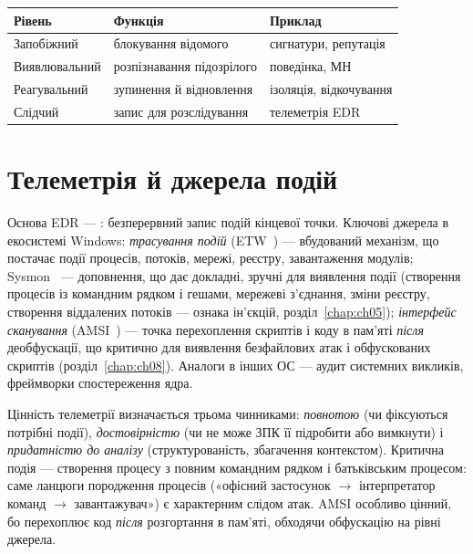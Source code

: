 
\begin{center}\footnotesize
\begin{tabularx}{\linewidth}{L{22mm} Y L{20mm}}
\toprule
Рівень & Функція & Приклад \\
\midrule
Запобіжний & блокування відомого & сигнатури, репутація \\
Виявлювальний & розпізнавання підозрілого & поведінка, МН \\
Реагувальний & зупинення й відновлення & ізоляція, відкочування \\
Слідчий & запис для розслідування & телеметрія EDR \\
\bottomrule
\end{tabularx}
\end{center}

\section{Телеметрія й джерела подій}\label{sec:ch10-telemetry}

Основа EDR --- : безперервний запис подій кінцевої точки. Ключові джерела в екосистемі Windows: \emph{трасування подій} (ETW~\cite{ch10:etw}) --- вбудований механізм, що постачає події процесів, потоків, мережі, реєстру, завантаження модулів; Sysmon~\cite{ch10:sysmon} --- доповнення, що дає докладні, зручні для виявлення події (створення процесів із командним рядком і гешами, мережеві з'єднання, зміни реєстру, створення віддалених потоків --- ознака ін'єкцій, розділ~\ref{chap:ch05}); \emph{інтерфейс сканування} (AMSI~\cite{ch10:amsi}) --- точка перехоплення скриптів і коду в пам'яті \emph{після} деобфускації, що критично для виявлення безфайлових атак і обфускованих скриптів (розділ~\ref{chap:ch08}). Аналоги в інших ОС --- аудит системних викликів, фреймворки спостереження ядра.

Цінність телеметрії визначається трьома чинниками: \emph{повнотою} (чи фіксуються потрібні події), \emph{достовірністю} (чи не може ЗПК її підробити або вимкнути) і \emph{придатністю до аналізу} (структурованість, збагачення контекстом). Критична подія --- створення процесу з повним командним рядком і батьківським процесом: саме ланцюги породження процесів («офісний застосунок $\to$ інтерпретатор команд $\to$ завантажувач») є характерним слідом атак. AMSI особливо цінний, бо перехоплює код \emph{після} розгортання в пам'яті, обходячи обфускацію на рівні джерела.

